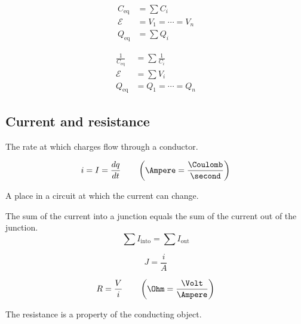 \begin{example}
  \begin{align*}
    C_\text{eq} &= \sum C_i \\
    \mathcal{E} &= V_1 = \cdots = V_n \\
    Q_\text{eq} &= \sum Q_i
  \end{align*}
\end{example}

\begin{example}
  \begin{align*}
    \frac{1}{C_\text{eq}} &= \sum \frac{1}{C_i} \\
    \mathcal{E} &= \sum V_i \\
    Q_\text{eq} &= Q_1 = \cdots = Q_n
  \end{align*}
\end{example}

\subsection{Current and resistance}

\begin{definition}
  The rate at which charges flow through a conductor.

  \[
    i = I = \frac{dq}{dt} \qquad \left(\Ampere = \frac{\Coulomb}{\second}\right)
  \]
\end{definition}

\begin{definition}[Junction]
  A place in a circuit at which the current can change.
\end{definition}

\begin{law}
  The sum of the current into a junction equals the sum of the current out of the junction.
  \[
    \sum I_\text{into} = \sum I_\text{out}
  \]
\end{law}

\begin{definition}
  \[
    J = \frac{i}{A}
  \]
\end{definition}

\begin{definition}[Resistance ($R$)]
  \[
    R = \frac{V}{i} \qquad \left( \Ohm = \frac{\Volt}{\Ampere} \right)
  \]

  The resistance is a property of the conducting object.
\end{definition}

